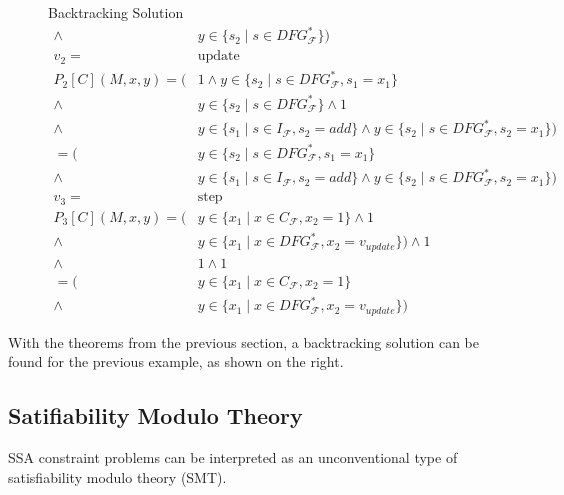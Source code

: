 \begin{figure}[p]
\begin{blackwhitebox}{Backtracking Solution}
\begin{align*}
                \mathrel\land{}&y\in\{s_2\mid s\in DFG_\mathcal{F}^*\})\\[1em]
            v_2={}&\text{update}\\
            P_2[C](M,x,y)=    (&1
                \mathrel\land   y\in\{s_2\mid s\in DFG_\mathcal{F}^*,s_1=x_1\}\\
                \mathrel\land{}&y\in\{s_2\mid s\in DFG_\mathcal{F}^*\}
                \mathrel\land   1\\
                \mathrel\land{}&y\in\{s_1\mid s\in I_\mathcal{F},s_2=add\}
                \mathrel\land   y\in\{s_2\mid s\in DFG_\mathcal{F}^*,s_2=x_1\})\\[1em]
                         =    (&y\in\{s_2\mid s\in DFG_\mathcal{F}^*,s_1=x_1\}\\
                \mathrel\land{}&y\in\{s_1\mid s\in I_\mathcal{F},s_2=add\}
                \mathrel\land   y\in\{s_2\mid s\in DFG_\mathcal{F}^*,s_2=x_1\})\\[1em]
            v_3={}&\text{step}\\
            P_3[C](M,x,y)=  ({}&y\in\{x_1\mid x\in C_\mathcal{F}, x_2=1\}
                \mathrel\land   1\\
                \mathrel\land{}&y\in\{x_1\mid x\in DFG_\mathcal{F}^*, x_2=v_{update}\})
                \mathrel\land   1\\
                \mathrel\land{}&1
                \mathrel\land   1\\[1em]
                         =  ({}&y\in\{x_1\mid x\in C_\mathcal{F}, x_2=1\}\\
                \mathrel\land{}&y\in\{x_1\mid x\in DFG_\mathcal{F}^*, x_2=v_{update}\})
        \end{align*}
    \end{blackwhitebox}
\end{figure}

    With the theorems from the previous section, a backtracking solution can
    be found for the previous example, as shown on the right.

\subsection{Satifiability Modulo Theory}

    SSA constraint problems can be interpreted as an unconventional type of
    satisfiability modulo theory (SMT).
    
